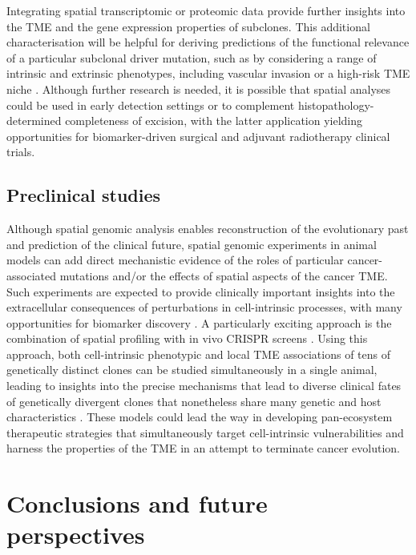 Integrating spatial transcriptomic or proteomic data provide further insights into the \ac{TME} and the gene expression properties of subclones. This additional characterisation will be helpful for deriving predictions of the functional relevance of a particular subclonal driver mutation, such as by considering a range of intrinsic and extrinsic phenotypes, including vascular invasion or a high-risk \ac{TME} niche . Although further research is needed, it is possible that spatial analyses could be used in early detection settings or to complement histopathology-determined completeness of excision, with the latter application yielding opportunities for biomarker-driven surgical and adjuvant radiotherapy clinical trials.

\subsection*{Preclinical studies}

Although spatial genomic analysis enables reconstruction of the evolutionary past and prediction of the clinical future, spatial genomic experiments in animal models can add direct mechanistic evidence of the roles of particular cancer-associated mutations and/or the effects of spatial aspects of the cancer \ac{TME}. Such experiments are expected to provide clinically important insights into the extracellular consequences of perturbations in cell-intrinsic processes, with many opportunities for biomarker discovery \parencite{Van_Maldegem2021-ta,Janiszewska2019-zq}. A particularly exciting approach is the combination of spatial profiling with in vivo CRISPR screens \parencite{Ji2020-gn,Dhainaut2022-nj}. Using this approach, both cell-intrinsic phenotypic and local TME associations of tens of genetically distinct clones can be studied simultaneously in a single animal, leading to insights into the precise mechanisms that lead to diverse clinical fates of genetically divergent clones that nonetheless share many genetic and host characteristics \parencite{Dhainaut2022-nj}. These models could lead the way in developing pan-ecosystem therapeutic strategies that simultaneously target cell-intrinsic vulnerabilities and harness the properties of the \ac{TME} in an attempt to terminate cancer evolution.

\section{Conclusions and future perspectives}

